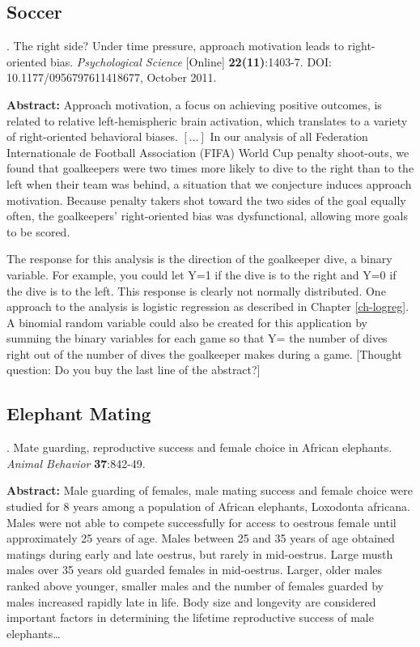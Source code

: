 \documentclass[
]{krantz}
\renewenvironment{quote}{\begin{VF}}{\end{VF}}
\begin{document}
\hypertarget{soccer}{%
\subsection{Soccer}\label{soccer}}

\citet{Roskes2011} . The right side? Under time pressure, approach motivation leads to right-oriented bias. \emph{Psychological Science} {[}Online{]} \textbf{22(11)}:1403-7. DOI: 10.1177/0956797611418677, October 2011.

\begin{quote}
\textbf{Abstract:} Approach motivation, a focus on achieving positive outcomes, is related to relative left-hemispheric brain activation, which translates to a variety of right-oriented behavioral biases. \([\ldots]\) In our analysis of all Federation Internationale de Football Association (FIFA) World Cup penalty shoot-outs, we found that goalkeepers were two times more likely to dive to the right than to the left when their team was behind, a situation that we conjecture induces approach motivation. Because penalty takers shot toward the two sides of the goal equally often, the goalkeepers' right-oriented bias was dysfunctional, allowing more goals to be scored.
\end{quote}

The response for this analysis is the direction of the goalkeeper dive, a binary variable. For example, you could let Y=1 if the dive is to the right and Y=0 if the dive is to the left. This response is clearly not normally distributed. One approach to the analysis is logistic regression as described in Chapter \ref{ch-logreg}. A binomial random variable could also be created for this application by summing the binary variables for each game so that Y= the number of dives right out of the number of dives the goalkeeper makes during a game. {[}Thought question: Do you buy the last line of the abstract?{]}

\hypertarget{elephant-mating}{%
\subsection{Elephant Mating}\label{elephant-mating}}

\citet{Poole1989} . Mate guarding, reproductive success and female choice in African elephants. \emph{Animal Behavior} \textbf{37}:842-49.

\begin{quote}
\textbf{Abstract:} Male guarding of females, male mating success and female choice were studied for 8 years among a population of African elephants, Loxodonta africana. Males were not able to compete successfully for access to oestrous female until approximately 25 years of age. Males between 25 and 35 years of age obtained matings during early and late oestrus, but rarely in mid-oestrus. Large musth males over 35 years old guarded females in mid-oestrus. Larger, older males ranked above younger, smaller males and the number of females guarded by males increased rapidly late in life. Body size and longevity are considered important factors in determining the lifetime reproductive success of male elephants\ldots{}
\end{quote}
\end{document}
